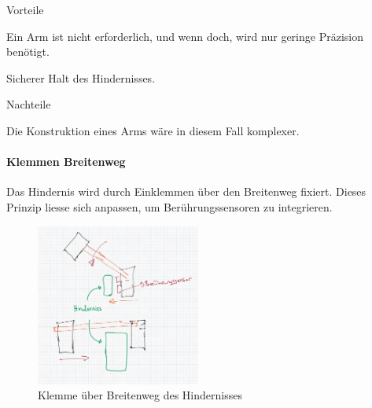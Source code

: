 \documentclass[../main.tex]{subfiles}
\begin{document}
\begin{minipage}[t]{0.48\textwidth}
    \begin{items}
          \item [Vorteile]
          \item Ein Arm ist nicht erforderlich, und wenn doch, wird nur geringe Präzision benötigt.
          \item Sicherer Halt des Hindernisses.
    \end{items}
\end{minipage}
\hfill
\begin{minipage}[t]{0.48\textwidth}
    \begin{items}
          \item [Nachteile]
          \item Die Konstruktion eines Arms wäre in diesem Fall komplexer.
    \end{items}
\end{minipage}
\newpage
\paragraph{Klemmen Breitenweg}
Das Hindernis wird durch Einklemmen über den Breitenweg fixiert. Dieses Prinzip liesse sich anpassen, um Berührungssensoren zu integrieren.

\begin{figure}[h]
        \centering
        \includegraphics[width=0.48\textwidth]{img/technologierecherche/Aufnahme/Breiterweg_Griff.jpg}
        \caption{Klemme über Breitenweg des Hindernisses}
        \label{img:tech_Breiterweg_Griff}
\end{figure}
\end{document}
